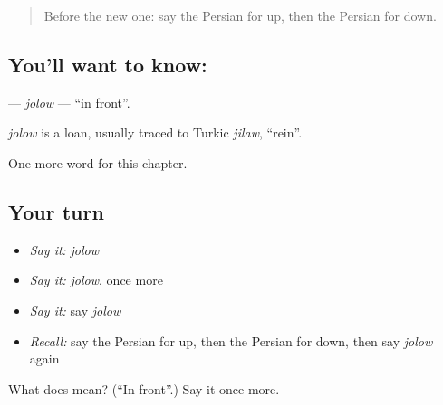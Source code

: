 \begin{quote}
Before the new one: say the Persian for up, then the Persian for down.
\end{quote}

\subsection*{You'll want to know: }
\textbf{} — \emph{jolow} — \textquotedblleft{}in front\textquotedblright{}.

\begin{cousinweb}
\emph{jolow} is a loan, usually traced to Turkic \emph{jilaw}, \textquotedblleft{}rein\textquotedblright{}.
\end{cousinweb}

\begin{grammarlens}[title={What you've built}]
One more word for this chapter.
\end{grammarlens}

\subsection*{Your turn}
\begin{itemize}
\raggedright
  \item \emph{Say it:} \emph{jolow}
  \item \emph{Say it:} \emph{jolow}, once more
  \item \emph{Say it:} say \emph{jolow}
  \item \emph{Recall:} say the Persian for up, then the Persian for down, then say \emph{jolow} again
\end{itemize}

\begin{tcolorbox}[breakable,colback=teal!4,colframe=teal!35!black,title={Before you move on}]
What does  mean? (\textquotedblleft{}In front\textquotedblright{}.) Say it once more.
\end{tcolorbox}
